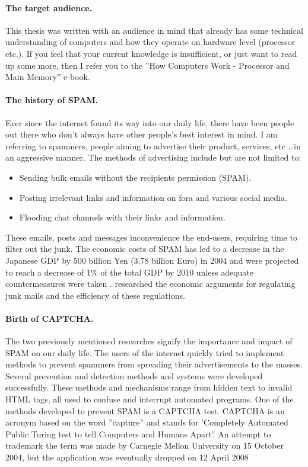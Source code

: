 \documentclass[pdftex,a4paper,12pt,twoside]{report}
\theoremstyle{plain} \newtheorem{theorem}{Theorem} \newtheorem{proposition}{Proposition} \newtheorem{lemma}{Lemma} \newtheorem*{corollary}{Corollary}
\theoremstyle{definition} \newtheorem{definition}{Definition} \newtheorem{conjecture}{Conjecture} \newtheorem*{example}{Example} \newtheorem{algorithm}{Algorithm}
\theoremstyle{remark} \newtheorem*{remark}{Remark} \newtheorem*{note}{Note} \newtheorem{case}{Case}
\begin{document}
\paragraph{The target audience.}
This thesis was written with an audience in mind that already has some technical understanding of computers and how they operate on hardware level (processor etc.). If you feel that your current knowledge is insufficient, or just want to read up some more, then I refer you to the ''How Computers Work - Processor and Main Memory'' \citep{Young2001} e-book.
\paragraph{The history of SPAM.} 
Ever since the internet found its way into our daily life, there have been people out there who don't always have other people's best interest in mind. I am referring to spammers, people aiming to advertise their product, services, etc \ldots in an aggressive manner. The methods of advertising include but are not limited to: \begin{itemize}
\item Sending bulk emails without the recipients permission (SPAM). 
\item Posting irrelevant links and information on fora and various social media.
\item Flooding chat channels with their links and information. 
\end{itemize}
These emails, posts and messages inconvenience the end-users, requiring time to filter out the junk. The economic costs of SPAM has led to a decrease in the Japanese GDP by 500 billion Yen (3.78 billion Euro) in 2004 and were projected to reach a decrease of 1\% of the total GDP by 2010 unless adequate countermeasures were taken \citep{Ukai2007}. \citep{Khong2004} researched the economic arguments for regulating junk mails and the efficiency of these regulations.
\paragraph{Birth of CAPTCHA.} 
The two previously mentioned researches signify the importance and impact of SPAM on our daily life. The users of the internet quickly tried to implement methods to prevent spammers from spreading their advertisements to the masses. Several prevention and detection methods and systems were developed successfully. These methods and mechanisms range from hidden text to invalid HTML tags, all used to confuse and interrupt automated programs. One of the methods developed to prevent SPAM is a CAPTCHA test. CAPTCHA is an acronym based on the word ''capture'' and stands for 'Completely Automated Public Turing test to tell Computers and Humans Apart'. An attempt to trademark  the term was made by Carnegie Mellon University on 15 October 2004, but the application was eventually dropped on 12 April 2008
\end{document}
